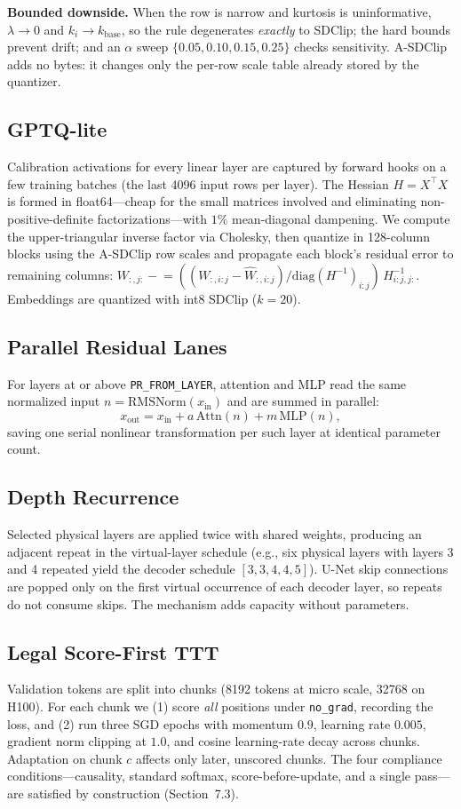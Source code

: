 \documentclass[10pt]{article}
\begin{document}
\textbf{Bounded downside.} When the row is narrow and kurtosis is uninformative,
$\lambda\to0$ and $k_i\to k_{\text{base}}$, so the rule degenerates \emph{exactly} to
SDClip; the hard bounds prevent drift; and an $\alpha$ sweep
$\{0.05,0.10,0.15,0.25\}$ checks sensitivity. A-SDClip adds no bytes: it changes only the
per-row scale table already stored by the quantizer.

\subsection{GPTQ-lite}
Calibration activations for every linear layer are captured by forward hooks on a few
training batches (the last 4096 input rows per layer). The Hessian $H=X^\top X$ is formed
in float64---cheap for the small matrices involved and eliminating non-positive-definite
factorizations---with $1\%$ mean-diagonal dampening. We compute the upper-triangular
inverse factor via Cholesky, then quantize in 128-column blocks using the A-SDClip row
scales and propagate each block's residual error to remaining columns:
$W_{:,j:}\mathrel{-}=((W_{:,i:j}-\hat W_{:,i:j})/\mathrm{diag}(H^{-1})_{i:j})\,
H^{-1}_{i:j,j:}$. Embeddings are quantized with int8 SDClip ($k=20$).

\subsection{Parallel Residual Lanes}
For layers at or above \texttt{PR\_FROM\_LAYER}, attention and MLP read the same
normalized input $n=\mathrm{RMSNorm}(x_{\text{in}})$ and are summed in parallel:
\begin{equation}
x_{\text{out}}=x_{\text{in}}+a\,\mathrm{Attn}(n)+m\,\mathrm{MLP}(n),
\end{equation}
saving one serial nonlinear transformation per such layer at identical parameter count.

\subsection{Depth Recurrence}
Selected physical layers are applied twice with shared weights, producing an adjacent
repeat in the virtual-layer schedule (e.g., six physical layers with layers 3 and 4
repeated yield the decoder schedule $[3,3,4,4,5]$). U-Net skip connections are popped
only on the first virtual occurrence of each decoder layer, so repeats do not consume
skips. The mechanism adds capacity without parameters.

\subsection{Legal Score-First TTT}
Validation tokens are split into chunks (8192 tokens at micro scale, 32768 on H100). For
each chunk we (1) score \emph{all} positions under \texttt{no\_grad}, recording the loss,
and (2) run three SGD epochs with momentum $0.9$, learning rate $0.005$, gradient norm
clipping at $1.0$, and cosine learning-rate decay across chunks. Adaptation on chunk $c$
affects only later, unscored chunks. The four compliance conditions---causality,
standard softmax, score-before-update, and a single pass---are satisfied by construction
(Section~7.3).
\end{document}
